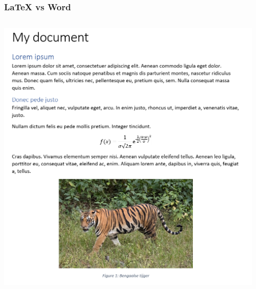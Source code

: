 \documentclass[../presentatie.tex]{subfiles}
\def\named#1{}
\begin{document}
    \clearrecentlist

    \named{intro-wordcomp-doc}
    \begin{frame}
        \frametitle{\LaTeX{} vs Word}

        \begin{columns}
            \begin{column}{0.5\textwidth}
                \includegraphics[width=\linewidth,height=0.8\textheight,keepaspectratio]{assets/1_Inleiding/basicDocWordSnippet.png}
            \end{column}
            \begin{column}{0.5\textwidth}

\end{column}
\end{columns}
\end{frame}
\end{document}
